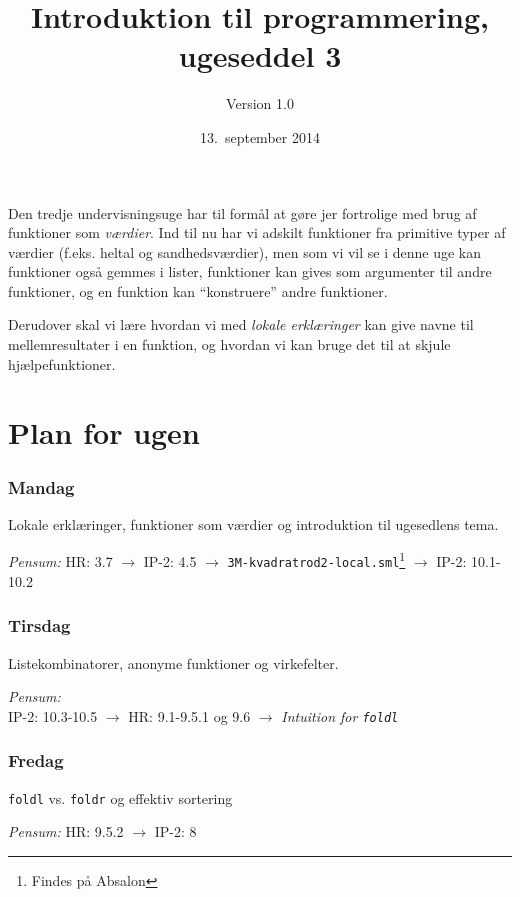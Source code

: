 \documentclass[a4paper,12pt]{article}
\title{Introduktion til programmering, ugeseddel 3}
\author{Version 1.0}%
\date{13.\ september 2014}
\makeatletter
\newcommand\footnoteref[1]{\protected@xdef\@thefnmark{\ref{#1}}\@footnotemark}
\makeatother
\begin{document}
\maketitle{}
Den tredje undervisningsuge har til formål at gøre jer fortrolige med
brug af funktioner som \textit{værdier}. Ind til nu har vi adskilt
funktioner fra primitive typer af værdier (f.eks. heltal og
sandhedsværdier), men som vi vil se i denne uge kan funktioner også
gemmes i lister, funktioner kan gives som argumenter til andre
funktioner, og en funktion kan "`konstruere"' andre funktioner.

Derudover skal vi lære hvordan vi med \textit{lokale erklæringer} kan
give navne til mellemresultater i en funktion, og hvordan vi kan bruge
det til at skjule hjælpefunktioner.

\section{Plan for ugen}
\label{sec:pensum-og-plan}

\subsubsection*{Mandag}
Lokale erklæringer, funktioner som værdier og introduktion til
ugesedlens tema.

\textit{Pensum:} HR: 3.7 $\rightarrow$ IP-2: 4.5 $\rightarrow$
\texttt{\footnotesize 3M-kvadratrod2-local.sml}\footnote{\label{seeabsalon} Findes på Absalon} $\rightarrow$ IP-2:
10.1-10.2

\subsubsection*{Tirsdag}
Listekombinatorer, anonyme funktioner og virkefelter.

\textit{Pensum:}\\ IP-2: 10.3-10.5 $\rightarrow$ HR: 9.1-9.5.1 og 9.6 $\rightarrow$ \textit{Intuition for \texttt{foldl}}\footnoteref{seeabsalon}

\subsubsection*{Fredag}
\texttt{foldl} vs. \texttt{foldr} og effektiv sortering

\textit{Pensum:} HR: 9.5.2 $\rightarrow$ IP-2: 8

\newpage
\end{document}
